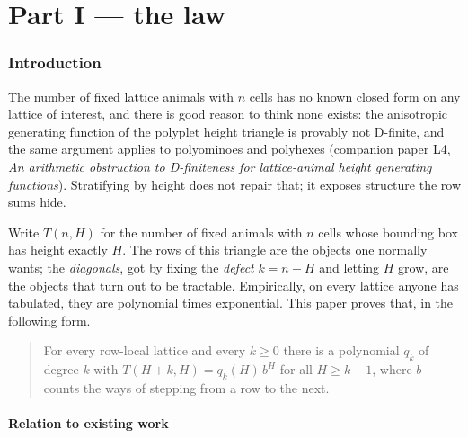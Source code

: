 \documentclass[11pt]{article}
\newcommand{\Z}{\mathbb{Z}}
\begin{document}
\begin{abstract}
Read along rows, the last nonzero residue of row $n$ is $1$, $1$, $2$
according to $n \bmod 3$, the third case being the deficit-$2$ cell, which we
treat separately by Lagrange--B\"urmann over $\Z/27$. We give a complete census
for $n \le 40$ of the cells whose $3$-adic valuation exceeds the deficit the law
forces on them; a closed formula for those exceptions is open. The cubic lifts:
$H^3 - H^2 \equiv 25t \pmod{27}$ with $25$ the single-defect weight of the
cluster decomposition, and $W$ returns as the level-$3$ correction.
\end{abstract}

\tableofcontents

\part*{Part I --- the law}

\section{Introduction}

The number of fixed lattice animals with $n$ cells has no known closed form on
any lattice of interest, and there is good reason to think none exists: the
anisotropic generating function of the polyplet height triangle is provably
not D-finite, and the same argument applies to polyominoes and polyhexes
(companion paper L4, \emph{An arithmetic obstruction to D-finiteness for
lattice-animal height generating functions}).
Stratifying by height does not repair that; it exposes structure the row sums
hide.

Write $T(n,H)$ for the number of fixed animals with $n$ cells whose bounding box
has height exactly $H$. The rows of this triangle are the objects one normally
wants; the \emph{diagonals}, got by fixing the \emph{defect} $k = n - H$ and
letting $H$ grow, are the objects that turn out to be tractable. Empirically, on every
lattice anyone has tabulated, they are polynomial times exponential. This paper
proves that, in the following form.

\begin{quote}
For every row-local lattice and every $k \ge 0$ there is a polynomial $q_k$ of
degree $k$ with $T(H+k,H) = q_k(H)\,b^H$ for all $H \ge k+1$, where $b$ counts
the ways of stepping from a row to the next.
\end{quote}

\subsection{Relation to existing work}
\label{sec:priorart}
\end{document}
